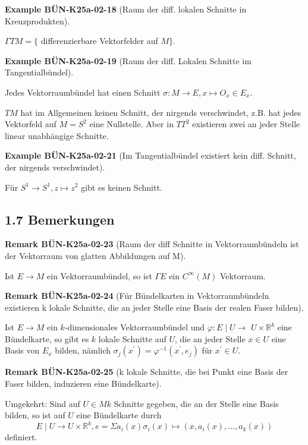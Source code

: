 \documentclass[10pt, letterpaper]{article}
\newcommand{\CustomHeading}[3]{%
  \par\medskip\noindent%
  \textbf{#1 #2} \textnormal{(#3)}.\enskip%
}
\newenvironment{REM}[2]{\begin{unitbox}\CustomHeading{Remark}{#1}{#2}}{\end{unitbox}}
\newenvironment{EXA}[2]{\begin{unitbox}\CustomHeading{Example}{#1}{#2}}{\end{unitbox}}
\begin{document}
\begin{EXA}{BÜN-K25a-02-18}{Raum der diff. lokalen Schnitte in Kreuzprodukten}
$\Gamma T M=\{$ differenzierbare Vektorfelder auf $M\}$.
\end{EXA}

\begin{EXA}{BÜN-K25a-02-19}{Raum der diff. Lokalen Schnitte im Tangentialbündel}
Jedes Vektorraumbündel hat einen Schnitt $\sigma: M \rightarrow E, x \mapsto O_{x} \in E_{x}$.
\end{EXA}

$T M$ hat im Allgemeinen keinen Schnitt, der nirgends verschwindet, z.B. hat jedes Vektorfeld auf $M=S^{2}$ eine Nullstelle. Aber in $T T^{2}$ existieren zwei an jeder Stelle linear unabhängige Schnitte.\\

\begin{EXA}{BÜN-K25a-02-21}{Im Tangentialbündel existiert kein diff. Schnitt, der nirgends verschwindet}
Für $S^{1} \rightarrow S^{1}, z \mapsto z^{2}$ gibt es keinen Schnitt.
\end{EXA}

\subsection*{1.7 Bemerkungen}

\begin{REM}{BÜN-K25a-02-23}{Raum der diff Schnitte in Vektorraumbündeln ist der Vektorraum von glatten Abbildungen auf M}
Ist $E \rightarrow M$ ein Vektorraumbündel, so ist $\Gamma E$ ein $C^{\infty}(M)$ Vektorraum.
\end{REM}



\begin{REM}{BÜN-K25a-02-24}{Für Bündelkarten in Vektorraumbündeln existieren k lokale Schnitte, die an jeder Stelle eine Basis der realen Faser bilden}
Ist $E \rightarrow M$ ein $k$-dimensionales Vektorraumbündel und $\varphi: E \mid U \rightarrow$ $U \times \mathbb{R}^{k}$ eine Bündelkarte, so gibt es $k$ lokale Schnitte auf $U$, die an jeder Stelle $x \in U$ eine Basis von $E_{x}$ bilden, nämlich $\sigma_{j}\left(x^{\prime}\right)=\varphi^{-1}\left(x^{\prime}, e_{j}\right)$ für $x^{\prime} \in U$.
\end{REM}


\begin{REM}{BÜN-K25a-02-25}{k lokale Schnitte, die bei Punkt eine Basis der Faser bilden, induzieren eine Bündelkarte}
Umgekehrt: Sind auf $U \in M k$ Schnitte gegeben, die an der Stelle eine Basis bilden, so ist auf $U$ eine Bündelkarte durch
$$
E \mid U \rightarrow U \times \mathbb{R}^{k}, e=\Sigma a_{i}(x) \sigma_{i}(x) \mapsto\left(x, a_{i}(x), \ldots, a_{k}(x)\right)
$$
definiert.
\end{REM}
\end{document}
